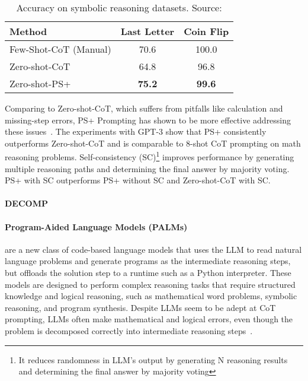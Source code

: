 \begin{table}[h!]
	\centering
	\begin{tabularx}{\textwidth}{Xcc}
		\hline
		\textbf{Method}       & \textbf{Last Letter} & \textbf{Coin Flip} \\ \hline
		Few-Shot-CoT (Manual) & 70.6                 & 100.0              \\
		Zero-shot-CoT         & 64.8                 & 96.8               \\
		Zero-shot-PS+         & \textbf{75.2}        & \textbf{99.6}      \\ \hline
	\end{tabularx}
	\caption{Accuracy on symbolic reasoning datasets. Source: \textcite{wang2023plan}}
	\label{tab:symbolic-reasoning}
\end{table}

Comparing to Zero-shot-CoT, which suffers from pitfalls like calculation and missing-step errors, PS+ Prompting has shown to be more effective addressing these issues~\cite{wang2023plan}.
The experiments with GPT-3 show that PS+ consistently outperforms Zero-shot-CoT and is comparable to 8-shot CoT prompting on math reasoning problems.
Self-consistency (SC)\footnote{It reduces randomness in LLM’s output by generating N reasoning results and determining the final answer by majority voting}\cite{wang2022self} improves performance by generating multiple reasoning paths and determining the final answer by majority voting.
PS+ with SC outperforms PS+ without SC and Zero-shot-CoT with SC\@.

\paragraph{DECOMP}
\label{par:decomp}
\lipsum[1]

\paragraph{Program-Aided Language Models (PALMs)}
\label{par:program-aided-language-models}

are a new class of code-based language models that uses the LLM to read natural language problems and generate programs as the intermediate reasoning steps, but offloads the solution step to a runtime such as a Python interpreter.
These models are designed to perform complex reasoning tasks that require structured knowledge and logical reasoning, such as mathematical word problems, symbolic reasoning, and program synthesis.
Despite LLMs seem to be adept at CoT prompting, LLMs often make mathematical and logical errors, even though the problem is decomposed correctly into intermediate reasoning steps~\cite{gao2022pal}.

